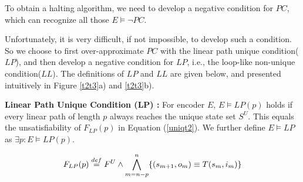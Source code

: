 \documentclass[journal]{IEEEtran}
\begin{document}
To obtain a halting algorithm,
we need to develop a negative condition for $PC$,
which can recognize all those $E\vDash\neg PC$.

Unfortunately,
it is very difficult,
if not impossible,
to develop such a condition.
So we choose to first over-approximate $PC$ with the linear path unique condition($LP$),
and then develop a negative condition for $LP$,
i.e.,
the loop-like non-unique condition($LL$).
The definitions of $LP$ and $LL$ are given below,
and presented intuitively in Figure \ref{t2t3}a) and \ref{t2t3}b).

\begin{definition11}\label{def_lfuc}%
\textbf{Linear Path Unique Condition ($\boldsymbol{LP}$) :}
For encoder $E$,
$E\vDash LP(p)$ holds if
every linear path of length $p$ always reaches the unique state set $S^{U}$.
This equals the unsatisfiability of $F_{LP}(p)$ in Equation (\ref{uniqt2}).
We further define $E\vDash LP$ as $\exists p:E\vDash LP(p)$.



\end{definition11}

\begin{equation}\label{uniqt2}
F_{LP}(p)\overset{def}{=} F^U\\
\wedge
\bigwedge_{m=n-p}^{n}
\{
(s_{m+1},o_m)\equiv T(s_m,i_m)
\}
\end{equation}


\end{document}
